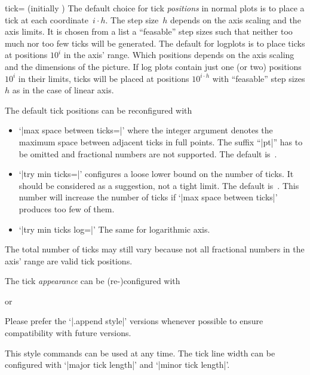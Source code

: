 \begin{pgfplotsxykey}{\x tick= (initially \marg{})}
\noindent
The default choice for tick \emph{positions} in normal plots is to place a tick at each coordinate~$i\cdot h$. The step size~$h$ depends on the axis scaling and the axis limits. It is chosen from a list a ``feasable'' step sizes such that neither too much nor too few ticks will be generated. The default for logplots is to place ticks at positions $10^i$ in the axis' range. Which positions depends on the axis scaling and the dimensions of the picture. If log plots contain just one (or two) positions $10^i$ in their limits, ticks will be placed at positions $10^{i\cdot h}$ with ``feasable'' step sizes $h$ as in the case of linear axis.

The default tick positions can be reconfigured with
\begin{itemize}
	\item `|max space between ticks=|' where the integer argument denotes the maximum space between adjacent ticks in full points. The suffix ``|pt|'' has to be omitted and fractional numbers are not supported. The default is~\axisdefaulttickwidth.
	\item `|try min ticks=|' configures a loose lower bound on the number of ticks. It should be considered as a suggestion, not a tight limit. The default is~\axisdefaulttryminticks. This number will increase the number of ticks if `|max space between ticks|' produces too few of them.
	\item `|try min ticks log=|' The same for logarithmic axis.
\end{itemize}
The total number of ticks may still vary because not all fractional numbers in the axis' range are valid tick positions.


\noindent
The tick \emph{appearance} can be (re-)configured with
\begin{codeexample}
\end{codeexample}
or
\begin{codeexample}
\end{codeexample}
Please prefer the `|.append style|' versions whenever possible to ensure compatibility with future versions.

This style commands can be used at any time. The tick line width can be configured with `|major tick length|' and `|minor tick length|'.


\end{pgfplotsxykey}
